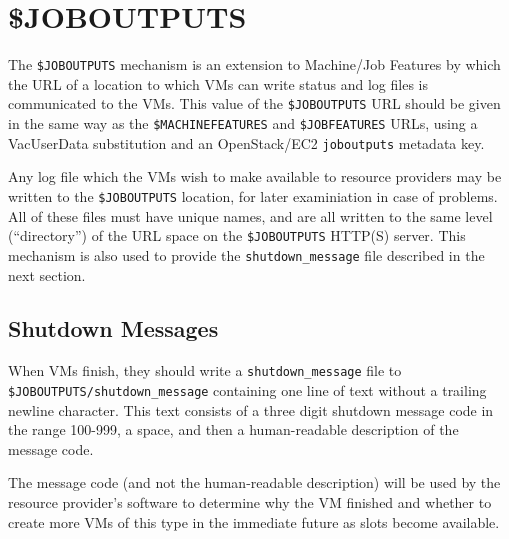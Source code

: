 \documentclass[12pt,a4paper]{article}
\begin{document}
\section{\$JOBOUTPUTS}
\label{sec:joboutputs}

The \texttt{\$JOBOUTPUTS} mechanism is an extension to Machine/Job Features by
which the URL of a location to which VMs can write status and log files
is communicated to the VMs. This value of the \texttt{\$JOBOUTPUTS} URL should
be given in the same way as the \texttt{\$MACHINEFEATURES} and 
\texttt{\$JOBFEATURES} URLs, using a VacUserData substitution and an
OpenStack/EC2 \texttt{joboutputs} metadata key. 

Any log file which the VMs wish to make available to resource providers
may be written to the \texttt{\$JOBOUTPUTS} location, for later examiniation
in case of problems. All of these files must have unique names, and
are all written to the same level (``directory'') of the URL
space on the \texttt{\$JOBOUTPUTS} HTTP(S) server. This mechanism is also used 
to provide the \texttt{shutdown\_message} file described in the next section.

\subsection{Shutdown Messages}
\label{sec:shutdownmessages}

When VMs finish, they should write a \texttt{shutdown\_message} file to
\texttt{\$JOBOUTPUTS/shutdown\_message} containing one line of text without
a trailing newline character. This text consists of a
three digit shutdown message code in the range 100-999, a space, 
and then a human-readable description of the message code. 

The message code (and not the human-readable description) will
be used by the resource provider's software to determine why
the VM finished and whether to create more VMs of this type in
the immediate future as slots become available.
\end{document}

